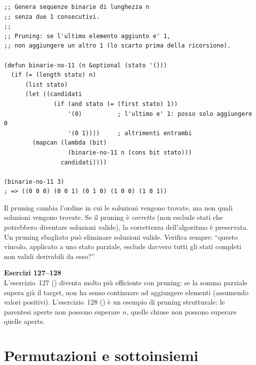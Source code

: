 \begin{esempio}
\begin{lstlisting}
;; Genera sequenze binarie di lunghezza n
;; senza due 1 consecutivi.
;;
;; Pruning: se l'ultimo elemento aggiunto e' 1,
;; non aggiungere un altro 1 (lo scarto prima della ricorsione).

(defun binarie-no-11 (n &optional (stato '()))
  (if (= (length stato) n)
      (list stato)
      (let ((candidati
              (if (and stato (= (first stato) 1))
                  '(0)          ; l'ultimo e' 1: posso solo aggiungere 0
                  '(0 1))))     ; altrimenti entrambi
        (mapcan (lambda (bit)
                  (binarie-no-11 n (cons bit stato)))
                candidati))))

(binarie-no-11 3)
; => ((0 0 0) (0 0 1) (0 1 0) (1 0 0) (1 0 1))
\end{lstlisting}
\end{esempio}

\begin{attenzione}
Il pruning cambia l'ordine in cui le soluzioni vengono
trovate, ma non quali soluzioni vengono trovate.
Se il pruning è \emph{corretto} (non esclude stati che
potrebbero diventare soluzioni valide), la correttezza
dell'algoritmo è preservata.
Un pruning sbagliato può eliminare soluzioni valide.
Verifica sempre: ``questo vincolo, applicato a uno stato parziale,
esclude davvero tutti gli stati completi non validi derivabili da esso?''
\end{attenzione}

\begin{workbook}
\textbf{Esercizi 127--128}\\[4pt]
L'esercizio~127 () diventa molto più efficiente
con pruning: se la somma parziale supera già il target, non ha senso
continuare ad aggiungere elementi (assumendo valori positivi).
L'esercizio~128 () è un esempio di pruning
strutturale: le parentesi aperte non possono superare $n$,
quelle chiuse non possono superare quelle aperte.
\end{workbook}

\section{Permutazioni e sottoinsiemi}

